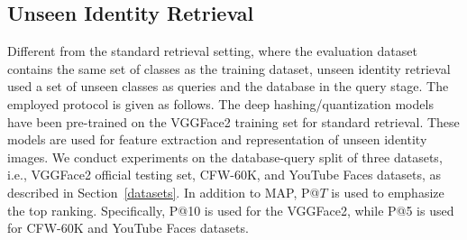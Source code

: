 \documentclass{elsarticle}
\begin{document}
\subsection{Unseen Identity Retrieval} \label{cross-domain}
Different from the standard retrieval setting, where the evaluation dataset contains the same set of classes as the training dataset, unseen identity retrieval~\cite{klein2019end,sablayrolles2017should} used a set of unseen classes as queries and the database in the query stage. 
The employed protocol is given as follows. The deep hashing/quantization models have been pre-trained on the VGGFace2 training set for standard retrieval. These models are used for feature extraction and representation of unseen identity images. We conduct experiments on the database-query split of three datasets, i.e., VGGFace2 official testing set, CFW-60K, and YouTube Faces datasets, as described in Section~\ref{datasets}. In addition to MAP, P@$T$ is used to emphasize the top ranking. Specifically, P@10 is used for the VGGFace2, while P@5 is used for CFW-60K and YouTube Faces datasets. 
\end{document}
